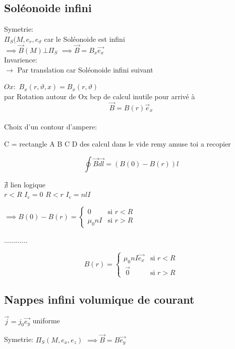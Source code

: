     
    
    \subsection{Soléonoide infini}
    
    Symetrie: \\
    $\Pi_S(M,e_r,e_{\vartheta}$ car le Soléonoide est infini \\ 
    $\implies \vec{B}(M) \bot \Pi_S$   $\implies \vec{B} = B_x \vec{e_x}$ \\
    
    Invarience: \\
    $\to $ Par translation car Soléonoide infini suivant
    
    $Ox: $ $B_x(r,\vartheta,x) = B_x(r,\vartheta)$ \\
    
    \to par Rotation autour de Ox
    bcp de calcul inutile pour arrivé à 
    \[ \boxed{ \vec{B} = B(r) \vec{e}_x}    \]
    \\
    Choix d'un contour d'ampere:
    
    C = rectangle A B C D
    des calcul dans le vide remy amuse toi a recopier 
    
    $$\oint \vec{B} \vec{dl} = (B(0) - B(r)) l$$
    
    $\nexists$ lien logique \\
    $r<R$  $I_e =0$
    $R<r $    $I_e = n l I$
    
    $\implies B(0) - B(r) = \begin{cases} 0 & \text{si } r < R \\ \mu_0 n I &  \text{si } r>R  \end{cases}$
 
 
    ............
    
    \[   B(r) = \begin{cases} \mu_0 n I \vec{e_x} & \text{si } r < R \\ \ \vec{0} & \text{si } r>R  \end{cases} \]
    
    \subsection{Nappes infini volumique de courant }
    
    $\vec{j} = j_0 \vec{e_y}$ uniforme
    
    Symetrie:          $\Pi_S(M,e_x,e_z)$            $\implies \vec{B} = B \vec{e_y}$
    
